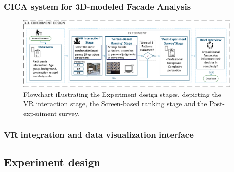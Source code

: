 \documentclass[final,5p,times]{elsarticle}%
\begin{document}
\begin{linenumbers}
    \subsubsection{CICA system for 3D-modeled Facade Analysis}
    \label{subsubsec:CICAfor3DmodeledFacades}
    

    \begin{figure}[htb]
        \centering
        \includegraphics[width= \linewidth]{Images/FlowchartExperiment}
          \caption{Flowchart illustrating the Experiment design stages, depicting the VR interaction stage, the Screen-based ranking stage and the Post-experiment survey.}
          \label{fig:ExperimentFlowchart}
    \end{figure}

    \subsubsection{VR integration and data visualization interface}
    \label{subsubsec:VR_integration}
    



    \subsection{Experiment design}
    \label{subsec:Experiment_design}
    


\end{linenumbers}
\end{document}
